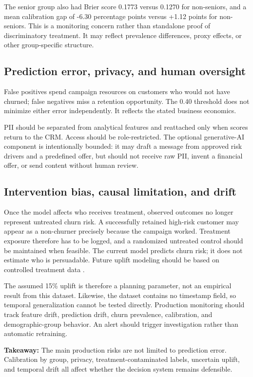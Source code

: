\documentclass[11pt]{article}
\newcommand{\takeaway}[1]{\vspace{1pt}\noindent\textbf{Takeaway:} #1\vspace{3pt}}
\begin{document}
The senior group also had Brier score 0.1773 versus 0.1270 for non-seniors, and a mean calibration gap of -6.30 percentage points versus +1.12 points for non-seniors. This is a monitoring concern rather than standalone proof of discriminatory treatment. It may reflect prevalence differences, proxy effects, or other group-specific structure.

\subsection{Prediction error, privacy, and human oversight}

False positives spend campaign resources on customers who would not have churned; false negatives miss a retention opportunity. The 0.40 threshold does not minimize either error independently. It reflects the stated business economics.

PII should be separated from analytical features and reattached only when scores return to the CRM. Access should be role-restricted. The optional generative-AI component is intentionally bounded: it may draft a message from approved risk drivers and a predefined offer, but should not receive raw PII, invent a financial offer, or send content without human review.

\subsection{Intervention bias, causal limitation, and drift}

Once the model affects who receives treatment, observed outcomes no longer represent untreated churn risk. A successfully retained high-risk customer may appear as a non-churner precisely because the campaign worked. Treatment exposure therefore has to be logged, and a randomized untreated control should be maintained when feasible. The current model predicts churn risk; it does not estimate who is persuadable. Future uplift modeling should be based on controlled treatment data \citep{gutierrez2017}.

The assumed 15\% uplift is therefore a planning parameter, not an empirical result from this dataset. Likewise, the dataset contains no timestamp field, so temporal generalization cannot be tested directly. Production monitoring should track feature drift, prediction drift, churn prevalence, calibration, and demographic-group behavior. An alert should trigger investigation rather than automatic retraining.

\takeaway{The main production risks are not limited to prediction error. Calibration by group, privacy, treatment-contaminated labels, uncertain uplift, and temporal drift all affect whether the decision system remains defensible.}
\end{document}
